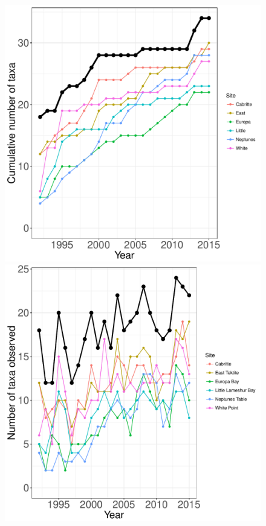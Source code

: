 \documentclass[11pt, oneside]{article}
\begin{document}
\begin{figure}[h!]
\centering
\includegraphics[scale = 0.4]{usvi-coral-castorani_species_accumulation_curve.pdf}
\includegraphics[scale = 0.4]{usvi-coral-castorani_num_taxa_over_time.pdf}

\end{figure}
\end{document}
